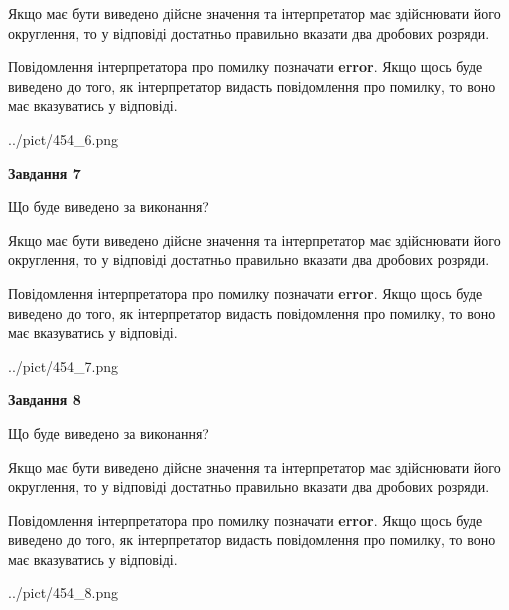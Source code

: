 \documentclass[12pt, ukrainian]{article}
\begin{document}
{\begin {Large}
Якщо має бути виведено дійсне значення та інтерпретатор має здійснювати його округлення, 
то у відповіді достатньо правильно вказати два дробових розряди.

Повідомлення інтерпретатора про помилку позначати \textbf{error}.
Якщо щось буде виведено до того, як інтерпретатор видасть повідомлення про помилку, 
то воно має вказуватись у відповіді. \par

\begin{center}
	{../pict/454_6.png}
\end{center}
\newpage

{\begin {center}\textbf{Завдання 7}\end {center}}\par
Що буде виведено за виконання? \par

Якщо має бути виведено дійсне значення та інтерпретатор має здійснювати його округлення, 
то у відповіді достатньо правильно вказати два дробових розряди.

Повідомлення інтерпретатора про помилку позначати \textbf{error}.
Якщо щось буде виведено до того, як інтерпретатор видасть повідомлення про помилку, 
то воно має вказуватись у відповіді. \par

\begin{center}
	{../pict/454_7.png}
\end{center}
\newpage

{\begin {center}\textbf{Завдання 8}\end {center}}\par
Що буде виведено за виконання? \par

Якщо має бути виведено дійсне значення та інтерпретатор має здійснювати його округлення, 
то у відповіді достатньо правильно вказати два дробових розряди.

Повідомлення інтерпретатора про помилку позначати \textbf{error}.
Якщо щось буде виведено до того, як інтерпретатор видасть повідомлення про помилку, 
то воно має вказуватись у відповіді. \par

\begin{center}
	{../pict/454_8.png}
\end{center}
\newpage


\end{Large}}
\end{document}
